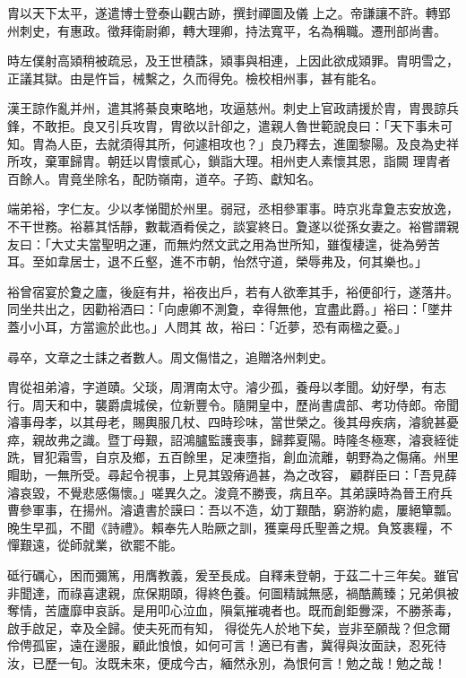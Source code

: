 \begin{pinyinscope}
 胄以天下太平，遂遣博士登泰山觀古跡，撰封禪圖及儀
 上之。帝謙讓不許。轉郢州刺史，有惠政。徵拜衛尉卿，轉大理卿，持法寬平，名為稱職。遷刑部尚書。



 時左僕射高熲稍被疏忌，及王世積誅，熲事與相連，上因此欲成熲罪。胄明雪之，正議其獄。由是忤旨，械繫之，久而得免。檢校相州事，甚有能名。



 漢王諒作亂并州，遣其將綦良東略地，攻逼慈州。刺史上官政請援於胄，胄畏諒兵鋒，不敢拒。良又引兵攻胄，胄欲以計卻之，遣親人魯世範說良曰：「天下事未可知。胄為人臣，去就須得其所，何遽相攻也？」良乃釋去，進圍黎陽。及良為史祥所攻，棄軍歸胄。朝廷以胄懷貳心，鎖詣大理。相州吏人素懷其恩，詣闕
 理胄者百餘人。胄竟坐除名，配防嶺南，道卒。子筠、獻知名。



 端弟裕，字仁友。少以孝悌聞於州里。弱冠，丞相參軍事。時京兆韋夐志安放逸，不干世務。裕慕其恬靜，數載酒肴侯之，談宴終日。夐遂以從孫女妻之。裕嘗謂親友曰：「大丈夫當聖明之運，而無灼然文武之用為世所知，雖復棲遑，徙為勞苦耳。至如韋居士，退不丘壑，進不市朝，怡然守道，榮辱弗及，何其樂也。」



 裕曾宿宴於夐之廬，後庭有井，裕夜出戶，若有人欲牽其手，裕便卻行，遂落井。同坐共出之，因勸裕酒曰：「向慮卿不測夐，幸得無他，宜盡此爵。」裕曰：「墜井蓋小小耳，方當逾於此也。」人問其
 故，裕曰：「近夢，恐有兩楹之憂。」



 尋卒，文章之士誄之者數人。周文傷惜之，追贈洛州刺史。



 胄從祖弟濬，字道賾。父琰，周渭南太守。濬少孤，養母以孝聞。幼好學，有志行。周天和中，襲爵虞城侯，位新豐令。隨開皇中，歷尚書虞部、考功侍郎。帝聞濬事母孝，以其母老，賜輿服几杖、四時珍味，當世榮之。後其母疾病，濬貌甚憂瘁，親故弗之識。暨丁母艱，詔鴻臚監護喪事，歸葬夏陽。時隆冬極寒，濬衰絰徙跣，冒犯霜雪，自京及鄉，五百餘里，足凍墮指，創血流離，朝野為之傷痛。州里賵助，一無所受。尋起令視事，上見其毀瘠過甚，為之改容，
 顧群臣曰：「吾見薛濬哀毀，不覺悲感傷懷。」嗟異久之。浚竟不勝喪，病且卒。其弟謨時為晉王府兵曹參軍事，在揚州。濬遺書於謨曰：吾以不造，幼丁艱酷，窮游約處，屢絕簞瓢。晚生早孤，不聞《詩禮》。賴奉先人貽厥之訓，獲稟母氏聖善之規。負笈裹糧，不憚艱遠，從師就業，欲罷不能。



 砥行礪心，困而彌篤，用膺教義，爰至長成。自釋耒登朝，于茲二十三年矣。雖官非聞達，而祿喜逮親，庶保期頤，得終色養。何圖精誠無感，禍酷薦臻；兄弟俱被奪情，苦廬靡申哀訴。是用叩心泣血，隕氣摧魂者也。既而創鉅釁深，不勝荼毒，啟手啟足，幸及全歸。使夫死而有知，
 得從先人於地下矣，豈非至願哉？但念爾伶俜孤宦，遠在邊服，顧此悢悢，如何可言！適已有書，冀得與汝面訣，忍死待汝，已歷一旬。汝既未來，便成今古，緬然永別，為恨何言！勉之哉！勉之哉！




\end{pinyinscope}
